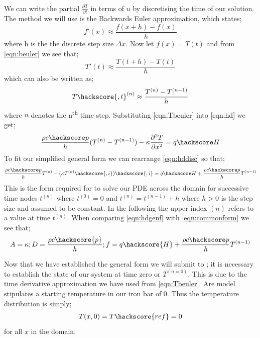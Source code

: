 We can write the partial $\frac{\partial T}{\partial t}$ in terms of $u$ by discretising the time of our solution. The method we will use is the Backwards Euler approximation, which states;
\begin{equation}
f'(x) \approx \frac{f(x+h)-f(x)}{h}
\label{eqn:beuler}
\end{equation}
where h is the the discrete step size $\Delta x$.
Now let $f(x) = T(t)$ and from \ref{eqn:beuler} we see that;
\begin{equation}
T'(t) \approx \frac{T(t+h) - T(t)}{h}
\end{equation}
which can also be written as;
\begin{equation}
T\hackscore{,t}^{(n)} \approx \frac{T^{(n)} - T^{(n-1)}}{h}
\label{eqn:Tbeuler}
\end{equation}
where $n$ denotes the n\textsuperscript{th} time step. Substituting \ref{eqn:Tbeuler} into \ref{eqn:hd} we get;
\begin{equation}
\frac{\rho c\hackscore p}{h} (T^{(n)} - T^{(n-1)}) - \kappa \frac{\partial^{2} T}{\partial x^{2}} = q\hackscore H 
\label{eqn:hddisc}
\end{equation}
To fit our simplified general form we can rearrange \ref{eqn:hddisc} so that;
\begin{equation}
\frac{\rho c\hackscore p}{h} T^{(n)} - (\kappa T^{(n)}\hackscore{,i})\hackscore{,i} = q\hackscore H +  \frac{\rho c\hackscore p}{h} T^{(n-1)}
\label{eqn:hdgenf}
\end{equation}
This is the form required for \ESCRIPT to solve our PDE across the domain for successive time nodes $t^{(n)}$ where 
$t^{(0)}=0$ and  $t^{(n)}=t^{(n-1)}+h$ where $h>0$ is the step size and assumed to be constant. 
In the following the upper index ${(n)}$ refers to a value at time $t^{(n)}$. When comparing \ref{eqn:hdgenf} with \ref{eqn:commonform} we see that;
\begin{equation}
A = \kappa; D = \frac{\rho c \hackscore{p}}{h}; f = q \hackscore{H} + \frac{\rho c\hackscore p}{h} T^{(n-1)}
\end{equation}

Now that we have established the general form we will submit to \ESCRIPT; it is necessary to establish the state of our system at time zero or $T^{(n=0)}$. This is due to the time derivative approximation we have used from \ref{eqn:Tbeuler}. Are model stipulates a starting temperature in our iron bar of 0\textcelsius. Thus the temperature distribution is simply;
\begin{equation}
T(x,0) = T\hackscore{ref} = 0
\end{equation}
for all $x$ in the domain. 

